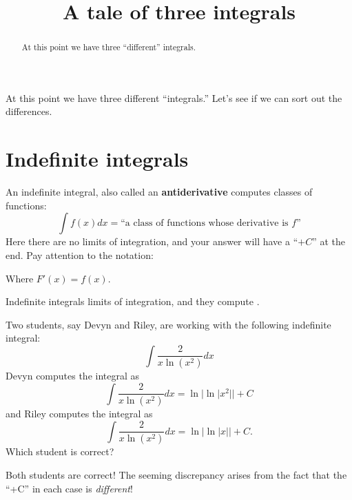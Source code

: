 \documentclass{ximera}
\title[Dig-In:]{A tale of three integrals}
\begin{document}
\begin{abstract}
  At this point we have three ``different'' integrals. 
\end{abstract}
\maketitle

At this point we have three different ``integrals.'' Let's see if we
can sort out the differences.

\section{Indefinite integrals}

An indefinite integral, also called an \textbf{antiderivative} computes
classes of functions:
\[
\int f(x) dx = \text{``a class of functions whose derivative is $f$''}
\]
Here there are no limits of integration, and your answer will have a
``$+C$'' at the end. Pay attention to the notation:
\begin{image}
\end{image}
Where $F'(x) = f(x)$.
\begin{explanation}%
  Indefinite integrals
   limits of
  integration, and they compute .
\end{explanation}

\begin{question}
  Two students, say Devyn and Riley, are working with the following
  indefinite integral:
  \[
  \int \frac{2}{x\ln(x^2)} dx
  \]
  Devyn computes the integral as
  \[
  \int \frac{2}{x\ln(x^2)} dx = \ln|\ln|x^2|| + C
  \]
  and Riley computes the integral as
  \[
  \int \frac{2}{x\ln(x^2)} dx = \ln|\ln|x|| + C.
  \]
  Which student is correct?
  \begin{multipleChoice}
  \end{multipleChoice}
  \begin{feedback}
    Both students are correct! The seeming discrepancy arises from the
    fact that the ``+C'' in each case is \textit{different}!
  \end{feedback}
\end{question}
\end{document}
